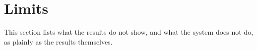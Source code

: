 \section{Limits}
\label{sec:limits}

This section lists what the results do not show, and what the system does not do, as plainly as the results themselves.

